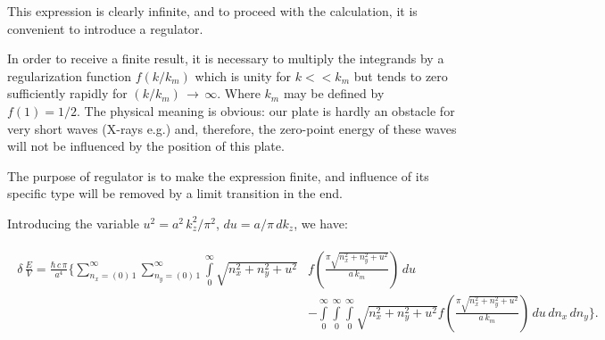 \documentclass[twoside, 10pt, ptm]{article}
\begin{document}
\begin{multicols}{2}

    This expression is clearly infinite, and to proceed with the
calculation, it is convenient to introduce a regulator.

    In order to receive a finite result, it is necessary to multiply the
integrands by a regularization function \(f(k/k_m)\) which is unity for
\(k << k_m\) but tends to zero sufficiently rapidly for
\((k/k_m)\, \rightarrow\,\infty\). Where \(k_m\) may be defined by
\(f(1) = {1}/{2}\). The physical meaning is obvious: our plate is hardly an obstacle for very short
waves (X-rays e.g.) and, therefore, the zero-point energy of these waves will not be
influenced by the position of this plate.

    The purpose of regulator is to make the expression finite, and
influence of its specific type will be removed by a limit transition in the end.

    Introducing the variable \(u^2 = a^2\,k_z^2/\pi^2\),
\(du = a/\pi\,dk_z\), we have:
\end{multicols}
\vspace{-3.5mm}
    \begin{equation} \label{eq:3}
\begin{array}{c}
\begin{array}{ll}
\delta\,\frac{E}{V} =
\frac{\hbar\,c\,\pi}{a^4}\Bigg\{
\sum\limits_{n_x=\left(0\right)\,1}^{\infty}
\sum\limits_{n_y=\left(0\right)\,1}^{\infty}
\int\limits_{0}^{\infty}
{\sqrt{n_x^2 + n_y^2 + u^2}} &
f\left(\frac{\pi\sqrt{n_x^2 + n_y^2 + u^2}}{a\,k_m}\right)
\,d{u} \\
\, &- \int\limits_{0}^{\infty}
\int\limits_{0}^{\infty}
\int\limits_{0}^{\infty}
{\sqrt{n_x^2 + n_y^2 + u^2}}
f\left(\frac{\pi\sqrt{n_x^2 + n_y^2 + u^2}}{a\,k_m}\right)
\,d{u}\,d{n_x}\,d{n_y}
\Bigg\}.
\end{array}
\end{array}
\end{equation}
\vspace{-3.5mm}
\end{document}
